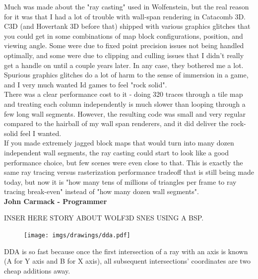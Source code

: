 \begin{fancyquotes}
\par
Much was made about the "ray casting" used in Wolfenstein, but the real reason for it was that I had a lot of trouble with wall-span rendering in Catacomb 3D.  C3D (and Hovertank 3D before that) shipped with various graphics glitches that you could get in some combinations of map block configurations, position, and viewing angle.  Some were due to fixed point precision issues not being handled optimally, and some were due to clipping and culling issues that I didn't really get a handle on until a couple years later.  In any case, they bothered me a lot.  Spurious graphics glitches do a lot of harm to the sense of immersion in a game, and I very much wanted Id games to feel "rock solid".
 \bigskip \\
There was a clear performance cost to it - doing 320 traces through a tile map and treating each column independently is much slower than looping through a few long wall segments.  However, the resulting code was small and very regular compared to the hairball of my wall span renderers, and it did deliver the rock-solid feel I wanted.
 \bigskip \\
If you made extremely jagged block maps that would turn into many dozen independent wall segments, the ray casting could start to look like a good performance choice, but few scenes were even close to that.  This is exactly the same ray tracing versus rasterization performance tradeoff that is still being made today, but now it is "how many tens of millions of triangles per frame to ray tracing break-even" instead of "how many dozen wall segments".
 \bigskip \\
\textbf{John Carmack - Programmer}
 \end{fancyquotes}

\par
INSER HERE STORY ABOUT WOLF3D SNES USING A BSP.\\

 \par
\begin{figure}[H]
  \centering
 \texttt{[image: imgs/drawings/dda.pdf]}
\end{figure}
\par


DDA is so fast because once the first intersection of a ray with an axis is known (A for Y axis and B for X axis), all subsequent intersections' coordinates are two cheap additions away.
\par


